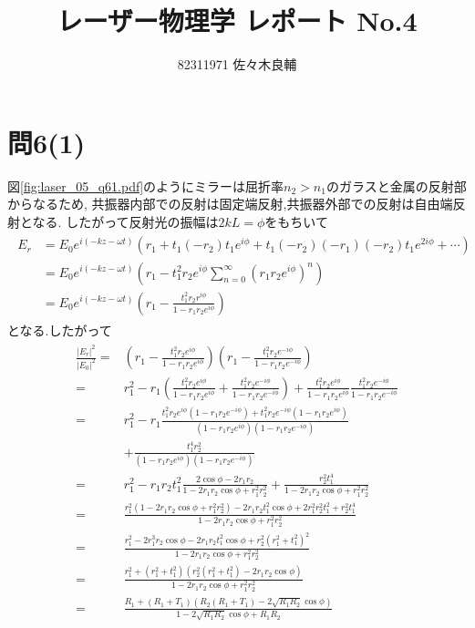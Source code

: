 \documentclass[uplatex,a4j,11pt,dvipdfmx]{jsarticle}
\begin{document}
\title{レーザー物理学 レポート No.4}
\author{82311971 佐々木良輔}
\date{}
\maketitle
\section*{問6(1)}
図\ref{fig:laser_05_q61.pdf}のようにミラーは屈折率$n_2>n_1$のガラスと金属の反射部からなるため,
共振器内部での反射は固定端反射,共振器外部での反射は自由端反射となる.
したがって反射光の振幅は$2kL=\phi$をもちいて
\begin{align}
  \begin{split}
    E_r&=E_0e^{i(-kz-\omega t)}\left(r_1+t_1(-r_2)t_1e^{i\phi}
    +t_1(-r_2)(-r_1)(-r_2)t_1e^{2i\phi}+\cdots\right)\\
    &=E_0e^{i(-kz-\omega t)}\left(r_1-t_1^2r_2e^{i\phi}\sum_{n=0}^\infty\left(r_1r_2e^{i\phi}\right)^n\right)\\
    &=E_0e^{i(-kz-\omega t)}\left(r_1-\frac{t_1^2r_2r^{i\phi}}{1-r_1r_2e^{i\phi}}\right)
  \end{split}
\end{align}
となる.したがって
\begin{align}
  \begin{split}
    \frac{|E_r|^2}{|E_0|^2}=&
    \left(r_1-\frac{t_1^2r_2e^{i\phi}}{1-r_1r_2e^{i\phi}}\right)
    \left(r_1-\frac{t_1^2r_2e^{-i\phi}}{1-r_1r_2e^{-i\phi}}\right)\\
    =&r_1^2-r_1\left(
      \frac{t_1^2r_2e^{i\phi}}{1-r_1r_2e^{i\phi}}+
      \frac{t_1^2r_2e^{-i\phi}}{1-r_1r_2e^{-i\phi}}
    \right)
    +\frac{t_1^2r_2e^{i\phi}}{1-r_1r_2e^{i\phi}}
    \frac{t_1^2r_2e^{-i\phi}}{1-r_1r_2e^{-i\phi}}\\
    =&r_1^2-r_1\frac{t_1^2r_2e^{i\phi}\left(1-r_1r_2e^{-i\phi}\right)+
    t_1^2r_2e^{-i\phi}\left(1-r_1r_2e^{i\phi}\right)}{\left(1-r_1r_2e^{i\phi}\right)\left(1-r_1r_2e^{-i\phi}\right)}\\
    &+\frac{t_1^4r_2^2}{\left(1-r_1r_2e^{i\phi}\right)\left(1-r_1r_2e^{-i\phi}\right)}\\
    =&r_1^2-r_1r_2t_1^2\frac{2\cos\phi-2r_1r_2}{1-2r_1r_2\cos\phi+r_1^2r_2^2}+
    \frac{r_2^2t_1^4}{1-2r_1r_2\cos\phi+r_1^2r_2^2}\\
    =&\frac{r_1^2\left(1-2r_1r_2\cos\phi+r_1^2r_2^2\right)-2r_1r_2t_1^2\cos\phi+2r_1^2r_2^2t_1^2+r_2^2t_1^4}
    {1-2r_1r_2\cos\phi+r_1^2r_2^2}\\
    =&\frac{r_1^2-2r_1^3r_2\cos\phi-2r_1r_2t_1^2\cos\phi+r_2^2(r_1^2+t_1^2)^2}{1-2r_1r_2\cos\phi+r_1^2r_2^2}\\
    =&\frac{r_1^2+(r_1^2+t_1^2)\left(r_2^2(r_1^2+t_1^2)-2r_1r_2\cos\phi\right)}
    {1-2r_1r_2\cos\phi+r_1^2r_2^2}\\
    =&\frac{R_1+(R_1+T_1)\left(R_2(R_1+T_1)-2\sqrt{R_1R_2}\cos\phi\right)}{1-2\sqrt{R_1R_2}\cos\phi+R_1R_2}
  \end{split}
\end{align}
\end{document}
